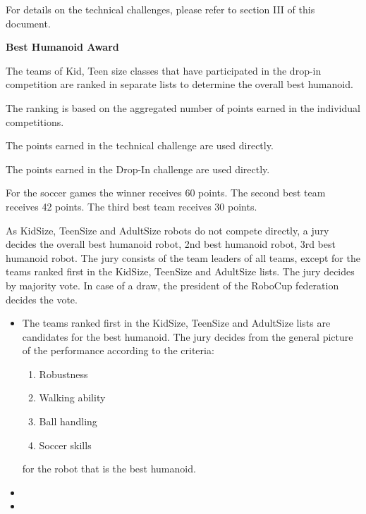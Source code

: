 For details on the technical challenges, please refer to section III of this document.

\bigskip

{\bfseries Best Humanoid Award}

\headlinebox
 
The teams  of Kid, Teen  size classes that have participated in the drop-in competition are ranked in separate lists to determine the overall best humanoid.

The ranking is based on the aggregated number of points earned in the individual competitions.

\bigskip

The points earned in the technical challenge are used directly.

\bigskip

The points earned in the Drop-In challenge are used directly.

\bigskip

For the soccer games the winner receives 60 points. The second best team receives 42 points. The third best team receives 30 points.

\bigskip

As KidSize, TeenSize and AdultSize robots do not compete directly, a jury decides the overall best humanoid robot, 2nd best humanoid robot, 3rd best humanoid robot. The jury consists of the team leaders of all teams, except for the teams ranked first in the KidSize, TeenSize and AdultSize lists. The jury decides by majority vote. In case of a draw, the president of the RoboCup federation decides the vote.

\begin{itemize}
\item The teams ranked first in the KidSize, TeenSize and AdultSize lists are candidates for the best humanoid. The jury decides from the general picture of the performance according to the criteria:
\begin{enumerate}
\item Robustness
\item Walking ability
\item Ball handling
\item Soccer skills
\end{enumerate}
for the robot that is the best humanoid.
\item {} 
\item {} 
\end{itemize}

